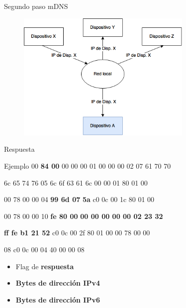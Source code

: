 \begin{frame}{Segundo paso mDNS}
	\begin{figure}[H]
		\centering
		\includegraphics[width=0.75\textwidth]{./Imagenes/mdns2.png}
		\label{fig:mdns2}
	\end{figure}
\end{frame}



\begin{frame}{Respuesta}
	\begin{exampleblock}{Ejemplo}
		 00 \textbf<2>{84 00} 00 00 00 01 \hspace{0.1cm} 00 00 00 02 07 61 70 70

		6c 65 74 76 05 6c 6f 63 \hspace{0.1cm} 61 6c 00 00 01 80 01 00

		00 78 00 00 04 \textbf<3>{99 6d 07} \hspace{0.1cm} \textbf<3>{5a} c0 0c 00 1c 80 01 00

		00 78 00 00 10 \textbf<4>{fe 80 00} \hspace{0.1cm} \textbf<4>{00 00 00 00 00 02 23 32}

		\textbf<4>{ff fe b1 21 52} c0 0c 00 \hspace{0.1cm} 2f 80 01 00 00 78 00 00

		08 c0 0c 00 04 40 00 00 \hspace{0.1cm} 08
	\end{exampleblock}
	
	\begin{itemize}
		\item Flag de \textbf<2>{respuesta}
		\item \textbf<3>{Bytes de dirección IPv4}
		\item \textbf<4>{Bytes de dirección IPv6}
	\end{itemize}
\end{frame}


